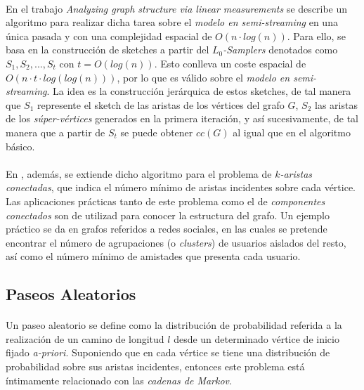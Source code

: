 \documentclass{subfiles}
\begin{document}
        \paragraph{}
        En el trabajo \emph{Analyzing graph structure via linear measurements} \cite{ahn2012analyzing} se describe un algoritmo para realizar dicha tarea sobre el \emph{modelo en semi-streaming} en una única pasada y con una complejidad espacial de $O(n \cdot log(n))$. Para ello, se basa en la construcción de sketches a partir del \emph{$L_0$-Samplers} denotados como $S_1, S_2, ..., S_t$ con $t = O(log(n))$. Esto conlleva un coste espacial de $O(n\cdot t \cdot log(log(n)))$, por lo que es válido sobre el \emph{modelo en semi-streaming}. La idea es la construcción jerárquica de estos sketches, de tal manera que $S_1$ represente el sketch de las aristas de los vértices del grafo $G$, $S_2$ las aristas de los \emph{súper-vértices} generados en la primera iteración, y así sucesivamente, de tal manera que a partir de $S_t$ se puede obtener $cc(G)$ al igual que en el algoritmo básico.

        \paragraph{}
        En \cite{ahn2012analyzing}, además, se extiende dicho algoritmo para el problema de \emph{$k$-aristas conectadas}, que indica el número mínimo de aristas incidentes sobre cada vértice. Las aplicaciones prácticas tanto de este problema como el de \emph{componentes conectados} son de utilizad para conocer la estructura del grafo. Un ejemplo práctico se da en grafos referidos a redes sociales, en las cuales se pretende encontrar el número de agrupaciones (o \emph{clusters}) de usuarios aislados del resto, así como el número mínimo de amistades que presenta cada usuario.

      \subsection{Paseos Aleatorios}
      \label{sec:random_walks_overview}

        \paragraph{}
        Un paseo aleatorio se define como la distribución de probabilidad referida a la realización de un camino de longitud $l$ desde un determinado vértice de inicio fijado \emph{a-priori}. Suponiendo que en cada vértice se tiene una distribución de probabilidad sobre sus aristas incidentes, entonces este problema está íntimamente relacionado con las \emph{cadenas de Markov}.
\end{document}

